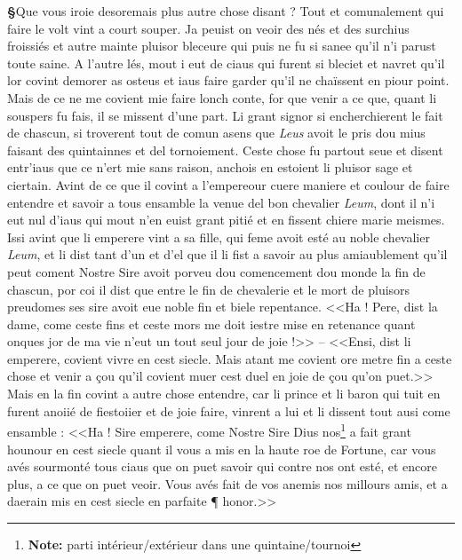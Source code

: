\documentclass[12pt]{article} %
\newcommand{\colmar}[1]{\marginnote{[#1]}}          %
\newcommand{\persName}[1]{\emph{#1}} %
\newcommand{\supplied}[1]{\textlangle#1\textrangle} %
\newcommand{\fnnote}[1]{\footnote{\textbf{Note:} #1}} %
\newcounter{paranum}
\newcommand{\pnum}{\stepcounter{paranum}\textbf{§\arabic{paranum}}\quad}
\begin{document}
\pnum Que vous iroie desoremais plus autre chose disant ? Tout et comunalement qui faire le volt vint a court souper. Ja peuist on veoir des nés et des surchius froissiés et autre mainte pluisor bleceure qui puis ne fu si sanee qu'il n'i parust toute saine. A l'autre lés, mout i eut de ciaus qui furent si bleciet et navret qu'il lor covint demorer as osteus et iaus faire garder qu'il ne chaïssent en piour point. Mais de ce ne me covient mie faire lonch conte, for que venir a ce que, quant li souspers fu fais, il se missent d'une part. Li grant signor si encherchierent le fait de chascun, si troverent tout de comun asens que \persName{Leus} avoit le pris dou mius faisant des quintainnes et del tornoiement. Ceste chose fu partout seue et disent entr'iaus que ce n'ert mie sans raison, anchois en estoient li pluisor sage et ciertain. Avint de ce que il covint a l'empereour cuere maniere et coulour de faire entendre et savoir a tous ensamble la venue del bon chevalier \persName{Leum}, dont il n'i eut nul d'iaus qui mout n'en euist grant pitié et en fissent chiere marie meis\colmar{7vb}\colmar{b}mes. Issi avint que li emperere vint a sa fille, qui feme avoit esté au noble chevalier \persName{Leum}, et li dist tant d'un et d'el que il li fist a savoir au plus amiaublement qu'il peut coment Nostre Sire avoit porveu dou comencement dou monde la fin de chascun, por coi il dist que entre le fin de chevalerie et le mort de pluisors preudomes ses sire avoit eue noble fin et biele repentance. <<Ha ! Pere, dist la dame, come ceste fins et ceste mors me doit iestre mise en retenance quant onques jor de ma vie n'eut un tout seul jour de joie !>> -- <<Ensi, dist li emperere, covient vivre en cest siecle. Mais atant me covient ore metre fin a ceste chose et venir a çou qu'il covient muer cest duel en joie de çou qu'on puet.>> Mais en la fin covint a autre chose entendre, car li prince et li baron qui tuit en furent anoiié de fiestoiier et de joie faire, vinrent a lui et li disse\supplied{n}t tout ausi come ensamble : <<Ha ! Sire emperere, come Nostre Sire Dius nos\fnnote{parti intérieur/extérieur dans une quintaine/tournoi} a fait grant hounour en cest siecle quant il vous a mis en la haute roe de Fortune, car vous avés sourmonté tous ciaus que on puet savoir qui contre nos ont esté, et encore plus, a ce que on puet veoir. Vous avés fait de vos anemis nos millours amis, et a daerain mis en cest siecle en parfaite ¶ honor.>>
\end{document}
